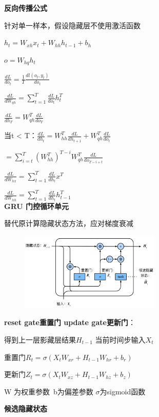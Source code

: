\documentclass[UTF8]{ctexart}
\begin{document}
  \textbf{反向传播公式} 
  
  \quad 针对单一样本，假设隐藏层不使用激活函数

  \quad \quad $h_t = W_{xh}x_t + W_{hh}h_{t-1} + b_h$

  \quad \quad $o = W_{hq}h_t$
  
  \quad $\frac{d L}{d o_t} = \frac{1}{T}\frac{d l(o_t, y_t)}{d o_t}$
  
  \quad $\frac{d L}{d W_{qh}} = \sum_{t=1}^{T}\frac{d L}{d o_t}h_t^T$
  
  \quad $\frac{d L}{d h_T} = W_{qh}^T\frac{d L}{d o_T}$
  
  \quad 当t < T：$\frac{d L}{d h_t} = W_{hh}^T\frac{d L}{d h_{t+1}} + W_{qh}^T\frac{d L}{d o_t}$
  
  \quad \quad $ = \sum_{i=t}^{T}(W_{hh}^T)^{T - i}W_{qh}^T\frac{d L}{d o_{T - i + t}}$
  
  \quad $\frac{d L}{d W_{hx}} = \sum_{t=1}^{T}\frac{d L}{d h_t}x^T$
  
  \quad $\frac{d L}{d W_{hh}} = \sum_{t=1}^{T}\frac{d L}{d h_t}h_{t-1}^T$\\
\textbf{GRU 门控循环单元}

  替代原计算隐藏状态方法，应对梯度衰减
  \begin{figure}[H] %
    \centering %
    \includegraphics[width=0.6\textwidth]{note_images/GRU.png} %
  \end{figure}

  \textbf{reset gate重置门 update gate更新门}：

  \quad 得到上一层影藏层结果$H_{t-1}$ 当前时间步输入$X_t$

  \quad 重置门$R_t = \sigma(X_tW_{xr} + H_{t-1}W_{hr} + b_r)$
  
  \quad 更新门$Z_t = \sigma(X_tW_{xz} + H_{t-1}W_{hz} + b_z)$

  \quad \quad W 为权重参数\ b为偏差参数 $\sigma$为sigmoid函数

  \textbf{候选隐藏状态}
\end{document}
